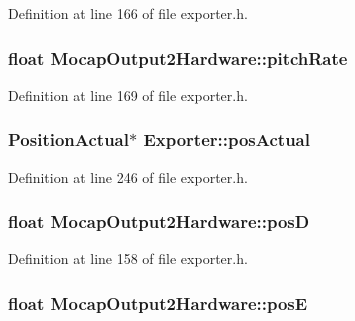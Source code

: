 \-Definition at line 166 of file exporter.\-h.

\hypertarget{group___mo_cap_plugin_ga03ecf7a98f0b6197c65a71fa1e2a1237}{
\subsubsection[{pitch\-Rate}]{\setlength{\rightskip}{0pt plus 5cm}float {\bf \-Mocap\-Output2\-Hardware\-::pitch\-Rate}}}\label{group___mo_cap_plugin_ga03ecf7a98f0b6197c65a71fa1e2a1237}


\-Definition at line 169 of file exporter.\-h.

\hypertarget{group___mo_cap_plugin_ga48e371afeb39f31ab368d804798313f5}{
\subsubsection[{pos\-Actual}]{\setlength{\rightskip}{0pt plus 5cm}\-Position\-Actual$\ast$ {\bf \-Exporter\-::pos\-Actual}}}\label{group___mo_cap_plugin_ga48e371afeb39f31ab368d804798313f5}


\-Definition at line 246 of file exporter.\-h.

\hypertarget{group___mo_cap_plugin_ga60ef031584e000727250ea18e4e0ce36}{
\subsubsection[{pos\-D}]{\setlength{\rightskip}{0pt plus 5cm}float {\bf \-Mocap\-Output2\-Hardware\-::pos\-D}}}\label{group___mo_cap_plugin_ga60ef031584e000727250ea18e4e0ce36}


\-Definition at line 158 of file exporter.\-h.

\hypertarget{group___mo_cap_plugin_gaeb486e47d519b624cd7b598eb6f33169}{
\subsubsection[{pos\-E}]{\setlength{\rightskip}{0pt plus 5cm}float {\bf \-Mocap\-Output2\-Hardware\-::pos\-E}}}\label{group___mo_cap_plugin_gaeb486e47d519b624cd7b598eb6f33169}


